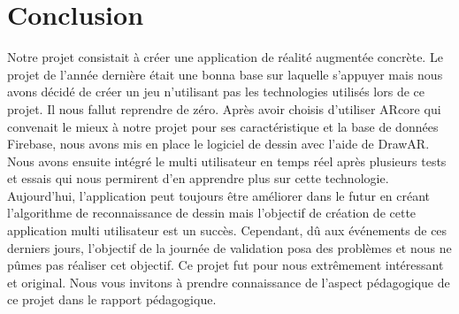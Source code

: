 \documentclass[12pt]{article}
\begin{document}
\section{Conclusion}
Notre projet consistait à créer une application de réalité augmentée concrète. Le projet de l'année dernière était une bonna base sur laquelle s'appuyer mais nous avons décidé de créer un jeu n'utilisant pas les technologies utilisés lors de ce projet. Il nous fallut reprendre de zéro. Après avoir choisis d'utiliser  ARcore qui convenait le mieux à notre projet pour ses caractéristique et la base de données Firebase, nous avons mis en place le logiciel de dessin avec l'aide de DrawAR. Nous avons ensuite intégré le multi utilisateur en temps réel après plusieurs tests et essais qui nous permirent d'en apprendre plus sur cette technologie. Aujourd'hui, l'application peut toujours être améliorer dans le futur en créant l'algorithme de reconnaissance de dessin mais l'objectif de création de cette application multi utilisateur est un succès. Cependant, dû aux événements de ces derniers jours, l'objectif de la journée de validation posa des problèmes et nous ne pûmes pas réaliser cet objectif.
\newline
Ce projet fut pour nous extrêmement intéressant et original. Nous vous invitons à prendre connaissance de l'aspect pédagogique de ce projet dans le rapport pédagogique.
\end{document}
